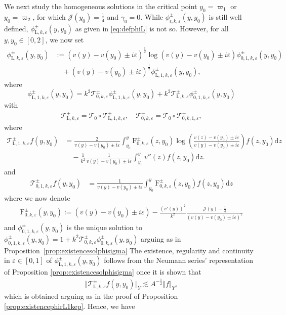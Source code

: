 \documentclass[11pt,reqno]{amsproc}
\theoremstyle{definition}
\numberwithin{equation}{section}
\newcommand{\rL}{{\mathrm{L}}}
\newcommand{\cJ}{{\mathcal{J}}}
\newcommand{\sr}{{\mathsf{r}}}
\newcommand{\cT}{{\mathcal T}}
\renewcommand{\d}{\mathrm{d}}
\newcommand{\ep}{\varepsilon}
\begin{document}
We next study the homogeneous solutions in the critical point $y_0=\varpi_1$ or $y_0=\varpi_2$, for which $\cJ(y_0)=\frac14$ and $\gamma_0=0$. While $\phi_{\sr,k,\ep}^\pm(y,y_0)$ is still well defined, $\phi_{\rL,k,\ep}^\pm(y,y_0)$ as given in \eqref{eq:defphiL} is not so. However, for all $y,y_0\in [0,2]$, we now set
\begin{equation}\label{eq:defphiLcrit}
\begin{split}
\phi_{\rL,k,\ep}^\pm(y,y_0) &:= (v(y) - v(y_0) \pm i\ep)^\frac12 \log( v(y) - v(y_0) \pm i\ep) \phi_{0,1,k,\ep}^\pm(y,y_0) \\
&\quad+ (v(y) - v(y_0) \pm i\ep)^\frac12\phi_{\rL,1,k,\ep}^\pm(y,y_0),
\end{split}
\end{equation}
where
\begin{equation}\label{eq:fixedpointeqphiLcrit}
\phi_{\rL,1,k,\ep}^\pm(y,y_0) = k^2 \cT_{0,k,\ep}^\pm\phi_{\rL,1,k,\ep}^\pm(y,y_0) + k^2\cT_{\rL,k,\ep}^\pm\phi_{0,1,k,\ep}^\pm(y,y_0)
\end{equation}
with 
\begin{align*}
\cT_{\rL,k,\ep}^\pm = \cT_0 \circ \cT_{\rL,1,k,\ep}^\pm, \quad \cT_{0,k,\ep}^\pm = \cT_0 \circ \cT_{0,k,1,\ep}^\pm,
\end{align*}
where
\begin{equation}\label{eq:defTrL1kep}
\begin{split}
\cT_{\rL,1,k,\ep}^\pm f(y,y_0) &= \frac{2}{v(y) - v(y_0) \pm i\ep}\int_{y_0}^{y}\mathrm{F}_{0,k,\ep}^\pm(z,y_0) \log \left( \frac{v(z) - v(y_0) \pm i\ep}{v(y) - v(y_0) \pm i\ep} \right) f(z, y_0) \d z \\
&\quad -\frac{1}{k^2}\frac{1}{v(y) - v(y_0) \pm i\ep}\int_{y_0}^y v''(z) f(z,y_0) \d z.
\end{split}
\end{equation}
and
\begin{equation}\label{eq:defT01kep}
\begin{split}
\cT_{0,1,k,\ep}^\pm f(y,y_0) &= \frac{1}{v(y) - v(y_0) \pm i\ep}\int_{y_0}^{y}\mathrm{F}_{0,k,\ep}^\pm(z,y_0)f(z, y_0) \d z 
\end{split}
\end{equation}
where we now denote
\begin{align}
\mathrm{F}_{0,k,\ep}^\pm(y,y_0) :=(v(y) - v(y_0) \pm i\ep) - \frac{(v'(y))^2}{k^2}\frac{\cJ(y)-\frac14}{(v(y) - v(y_0)\pm i\ep)^2} 
\end{align}
and $\phi_{0,1,k,\ep}^\pm(y,y_0)$ is the unique solution to $\phi_{0,1,k,\ep}^\pm(y,y_0) = 1 + k^2 \cT_{0,k,\ep}^\pm\phi_{0,k,\ep}^\pm(y,y_0)$ arguing as in Proposition~\ref{prop:existencesolphisigma} The existence, regularity and continuity in $\ep\in[0,1]$ of $\phi_{\rL,1,k,\ep}^\pm(y,y_0)$ follows from the Neumann series' representation of Proposition \ref{prop:existencesolphisigma} once it is shown that
\begin{align*}
\Vert \cT_{\rL,k,\ep}^\pm f(y,y_0) \Vert_Y \lesssim A^{-\frac12}\Vert f \Vert_Y,
\end{align*}
which is obtained arguing as in the proof of Proposition \ref{prop:existencephirL1kep}. Hence, we have
\end{document}
